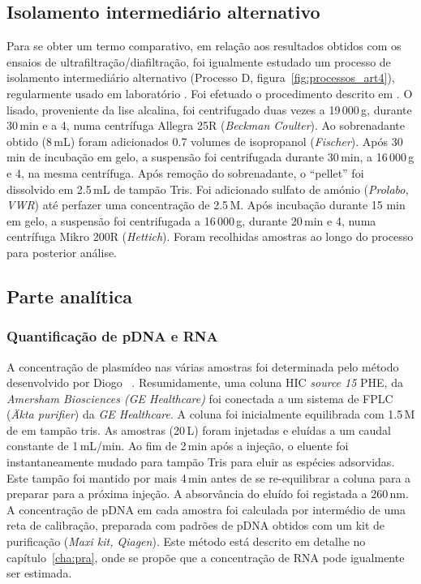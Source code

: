\subsection{Isolamento intermediário alternativo} %
\label{sub:isol_alter_final}
%
Para se obter um termo comparativo, em relação aos resultados obtidos com os ensaios de ultrafiltração/diafiltração, foi igualmente estudado um processo de isolamento intermediário alternativo (Processo D, figura~\ref{fig:processos_art4}), regularmente usado em laboratório \cite{sousabab,freitas}. Foi efetuado o procedimento descrito em \cite{sousabab}. O lisado, proveniente da lise alcalina, foi centrifugado duas vezes a 19\,000\,g, durante 30\,min e a 4\degreecelsius, numa centrífuga Allegra 25R (\emph{Beckman Coulter}).
%
Ao sobrenadante obtido (8\,mL) foram adicionados 0.7 volumes de isopropanol (\emph{Fischer}).
%
Após 30\,min de incubação em gelo, a suspensão foi centrifugada durante 30\,min, a 16\,000\,g e 4\degreecelsius, na mesma centrífuga. Após remoção do sobrenadante, o ``pellet'' foi dissolvido em 2.5\,mL de tampão Tris. Foi adicionado sulfato de amónio (\emph{Prolabo, VWR}) até perfazer uma concentração de 2.5\,M.
%
Após incubação durante 15 min em gelo, a suspensão foi centrifugada a 16\,000\,g, durante 20\,min e 4\degreecelsius, numa centrífuga Mikro 200R (\emph{Hettich}). Foram recolhidas amostras ao longo do processo para posterior análise.

\subsection{Parte analítica} %
\label{ssub:2.4art4}
\subsubsection{Quantificação de pDNA e RNA}
\label{ssubsub:2.4.1art4}
%
%
A concentração de plasmídeo nas várias amostras foi determinada pelo método desenvolvido por Diogo \et\ \cite{diogo}. Resumidamente, uma coluna HIC \emph{source 15} PHE, da \emph{Amersham Biosciences (GE Healthcare)} foi conectada a um sistema de FPLC (\emph{Äkta purifier}) da \emph{GE Healthcare}.
%
A coluna foi inicialmente equilibrada com 1.5\,M de  em tampão tris. As amostras (20\,\micro L) foram injetadas e eluídas a um caudal constante de 1\,mL/min. Ao fim de 2\,min após a injeção, o eluente foi instantaneamente mudado para tampão Tris para eluir as espécies adsorvidas. Este tampão foi mantido por mais 4\,min antes de se re-equilibrar a coluna para a preparar para a próxima injeção. A absorvância do eluído foi registada a 260\,nm. A concentração de pDNA em cada amostra foi calculada por intermédio de uma reta de calibração, preparada com padrões de pDNA obtidos com um kit de purificação (\emph{Maxi kit, Qiagen}). Este método está descrito em detalhe no capítulo~\ref{cha:pra}, onde se propõe que a concentração de RNA pode igualmente ser estimada.    

